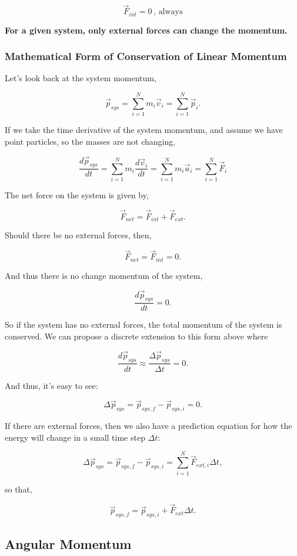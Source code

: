 \documentclass[11pt]{article}
\begin{document}
\[\vec{F}_{int} = 0\,\mathrm{,\,always}\]

\textbf{For a given system, only external forces can change the
momentum.}

    \subsubsection{Mathematical Form of Conservation of Linear
Momentum}\label{mathematical-form-of-conservation-of-linear-momentum}

Let's look back at the system momentum,

\[\vec{p}_{sys} = \sum_{i=1}^{N} m_i\vec{v}_i = \sum_{i=1}^{N} \vec{p}_i.\]

If we take the time derivative of the system momentum, and assume we
have point particles, so the masses are not changing,

\[\dfrac{d\vec{p}_{sys}}{dt} = \sum_{i=1}^{N} m_i\dfrac{d\vec{v}_i}{dt} = \sum_{i=1}^{N} m_i\vec{a}_i = \sum_{i=1}^{N} \vec{F}_i\]

The net force on the system is given by,

\[\vec{F}_{net} = \vec{F}_{int} + \vec{F}_{ext}.\]

Should there be no external forces, then,

\[\vec{F}_{net} = \vec{F}_{int} = 0.\]

And thus there is no change momentum of the system,

\[\dfrac{d\vec{p}_{sys}}{dt} = 0.\]

So if the system has no external forces, the total momentum of the
system is conserved. We can propose a discrete extension to this form
above where

\[\dfrac{d\vec{p}_{sys}}{dt} \approx \dfrac{\Delta\vec{p}_{sys}}{\Delta t} = 0.\]

And thus, it's easy to see:

\[\Delta \vec{p}_{sys} = \vec{p}_{sys,f} - \vec{p}_{sys,i} = 0.\]

If there are external forces, then we also have a prediction equation
for how the energy will change in a small time step \(\Delta t\):

\[\Delta \vec{p}_{sys} = \vec{p}_{sys,f} - \vec{p}_{sys,i} = \sum_{i=1}^{N} \vec{F}_{ext,i}\Delta t,\]

so that,

\[\vec{p}_{sys,f} = \vec{p}_{sys,i} + \vec{F}_{ext}\Delta t.\]

    \subsection{Angular Momentum}\label{angular-momentum}
\end{document}
